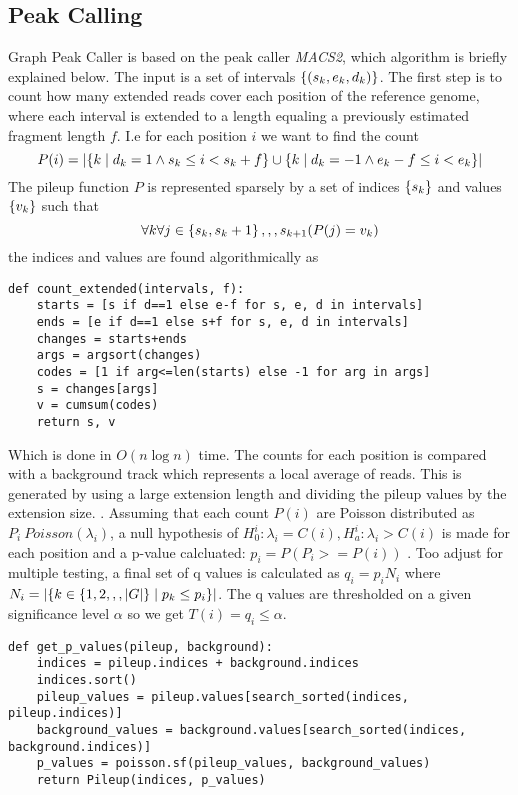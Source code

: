 \subsection{Peak Calling}
Graph Peak Caller is based on the peak caller \emph{MACS2}, which algorithm is briefly explained below. 
The input is a set of intervals $\left\{(s_k, e_k, d_k)\right\}$. The first step is to count how many extended reads cover each position of the reference genome, where each interval is extended to a length equaling a previously estimated fragment length $f$. I.e for each position $i$ we want to find the count
$$P(i)= \left|\left\{k \mid d_k=1 \wedge s_k \leq i < s_k+f\right\} \cup \left\{k \mid d_k=-1 \wedge e_k-f \leq i < e_k\right\}\right|$$
  The pileup function $P$ is represented sparsely by a set of indices $\left\{s_k\right\}$ and values $\left\{v_k\right\}$ such that $$\forall{k}\forall{j\in\left\{s_k, s_k+1\right\},,,s_{k+1}}(P(j) = v_k)$$
  the indices and values are found algorithmically as
  \begin{lstlisting}
def count_extended(intervals, f):    
    starts = [s if d==1 else e-f for s, e, d in intervals]
    ends = [e if d==1 else s+f for s, e, d in intervals]
    changes = starts+ends
    args = argsort(changes)
    codes = [1 if arg<=len(starts) else -1 for arg in args]
    s = changes[args]
    v = cumsum(codes)
    return s, v
  \end{lstlisting}
  Which is done in $O(n \log n)$ time. The counts for each position is compared with a background track which represents a local average of reads. This is generated by using a large extension length and dividing the pileup values by the extension size.
  .
  Assuming that each count $P(i)$ are Poisson distributed as $P_i ~ Poisson(\lambda_i)$, a null hypothesis of $H_0^i: \lambda_i=C(i), H_a^i:\lambda_i>C(i)$ is made for each position and a p-value calcluated: $p_i = P(P_i>=P(i))$ . Too adjust for multiple testing, a final set of q values is calculated as $q_i = p_iN_i$ where $N_i = \left|\left\{k\in\left\{1, 2,,,\left|G\right|\right\} \mid p_k\leq p_i\right\}\right|$. The q values are thresholded on a given significance level $\alpha$ so we get $T(i) = q_i\leq \alpha$. 
  \begin{lstlisting}
def get_p_values(pileup, background):
    indices = pileup.indices + background.indices
    indices.sort()
    pileup_values = pileup.values[search_sorted(indices, pileup.indices)]
    background_values = background.values[search_sorted(indices, background.indices)]
    p_values = poisson.sf(pileup_values, background_values)
    return Pileup(indices, p_values)
  \end{lstlisting}
